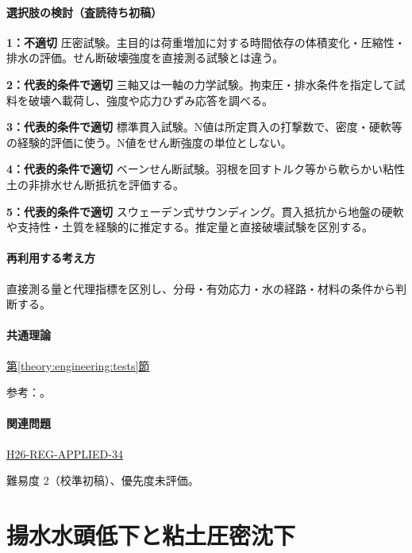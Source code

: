 \paragraph{選択肢の検討（査読待ち初稿）}\mbox{}\par

\noindent\textbf{1：不適切} 圧密試験。主目的は荷重増加に対する時間依存の体積変化・圧縮性・排水の評価。せん断破壊強度を直接測る試験とは違う。\par

\noindent\textbf{2：代表的条件で適切} 三軸又は一軸の力学試験。拘束圧・排水条件を指定して試料を破壊へ載荷し、強度や応力ひずみ応答を調べる。\par

\noindent\textbf{3：代表的条件で適切} 標準貫入試験。N値は所定貫入の打撃数で、密度・硬軟等の経験的評価に使う。N値をせん断強度の単位としない。\par

\noindent\textbf{4：代表的条件で適切} ベーンせん断試験。羽根を回すトルク等から軟らかい粘性土の非排水せん断抵抗を評価する。\par

\noindent\textbf{5：代表的条件で適切} スウェーデン式サウンディング。貫入抵抗から地盤の硬軟や支持性・土質を経験的に推定する。推定量と直接破壊試験を区別する。\par

\paragraph{再利用する考え方} 直接測る量と代理指標を区別し、分母・有効応力・水の経路・材料の条件から判断する。

\paragraph{共通理論} \hyperref[theory:engineering:tests]{第\ref*{theory:engineering:tests}節}

\par 参考：\cite{eng52_geotech_tests,eng52_consolidation}。

\paragraph{関連問題} \hyperref[q:h26-reg-applied-34]{H26-REG-APPLIED-34}

\par 難易度 2（校準初稿）、優先度未評価。

\section{揚水水頭低下と粘土圧密沈下}

